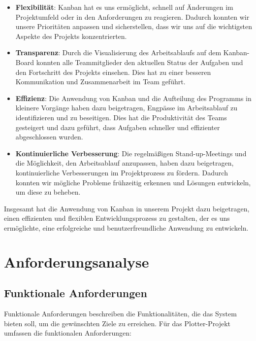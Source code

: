 \documentclass[a4paper]{article}
\begin{document}
\begin{itemize}
	\item \textbf{Flexibilität}: Kanban hat es uns ermöglicht, schnell auf Änderungen im Projektumfeld oder in den Anforderungen zu reagieren. Dadurch konnten wir unsere Prioritäten anpassen und sicherstellen, dass wir uns auf die wichtigsten Aspekte des Projekts konzentrierten.
	\item \textbf{Transparenz}: Durch die Visualisierung des Arbeitsablaufs auf dem Kanban-Board konnten alle Teammitglieder den aktuellen Status der Aufgaben und den Fortschritt des Projekts einsehen. Dies hat zu einer besseren Kommunikation und Zusammenarbeit im Team geführt.
	\item \textbf{Effizienz}: Die Anwendung von Kanban und die Aufteilung des Programms in kleinere Vorgänge haben dazu beigetragen, Engpässe im Arbeitsablauf zu identifizieren und zu beseitigen. Dies hat die Produktivität des Teams gesteigert und dazu geführt, dass Aufgaben schneller und effizienter abgeschlossen wurden.
	\item \textbf{Kontinuierliche Verbesserung}: Die regelmäßigen Stand-up-Meetings und die Möglichkeit, den Arbeitsablauf anzupassen, haben dazu beigetragen, kontinuierliche Verbesserungen im Projektprozess zu fördern. Dadurch konnten wir mögliche Probleme frühzeitig erkennen und Lösungen entwickeln, um diese zu beheben.
\end{itemize}

\newpage

Insgesamt hat die Anwendung von Kanban in unserem Projekt dazu beigetragen, einen effizienten und flexiblen Entwicklungsprozess zu gestalten, der es uns ermöglichte, eine erfolgreiche und benutzerfreundliche Anwendung zu entwickeln.

\section{Anforderungsanalyse}
\subsection{Funktionale Anforderungen}
Funktionale Anforderungen beschreiben die Funktionalitäten, die das System bieten soll, um die gewünschten Ziele zu erreichen. Für das Plotter-Projekt umfassen die funktionalen Anforderungen:
\end{document}
